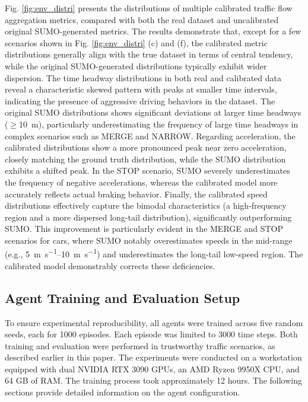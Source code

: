 Fig. \ref{fig:env_distri} presents the distributions of multiple calibrated traffic flow aggregation metrics, compared with both the real dataset and uncalibrated original SUMO-generated metrics. The results demonstrate that, except for a few scenarios shown in Fig. \ref{fig:env_distri} (c) and (f), the calibrated metric distributions generally align with the true dataset in terms of central tendency, while the original SUMO-generated distributions typically exhibit wider dispersion. The time headway distributions in both real and calibrated data reveal a characteristic skewed pattern with peaks at smaller time intervals, indicating the presence of aggressive driving behaviors in the dataset. The original SUMO distributions shows significant deviations at larger time headways ($\ge$\SI{10}{\meter}), particularly underestimating the frequency of large time headways in complex scenarios such as MERGE and NARROW.
Regarding acceleration, the calibrated distributions show a more pronounced peak near zero acceleration, closely matching the ground truth distribution, while the SUMO distribution exhibits a shifted peak.  In the STOP scenario, SUMO severely underestimates the frequency of negative accelerations, whereas the calibrated model more accurately reflects actual braking behavior. Finally, the calibrated speed distributions effectively capture the bimodal characteristics (a high-frequency region and a more dispersed long-tail distribution), significantly outperforming SUMO. This improvement is particularly evident in the MERGE and STOP scenarios for cars, where SUMO notably overestimates speeds in the mid-range (e.g., \SIrange{5}{10}{\metre\per\second}) and underestimates the long-tail low-speed region. The calibrated model demonstrably corrects these deficiencies.





\subsection{Agent Training and Evaluation Setup}
To ensure experimental reproducibility, all agents were trained across five random seeds, each for 1000 episodes. Each episode was limited to 3000 time steps. Both training and evaluation were performed in trustworthy traffic scenarios, as described earlier in this paper. 
The experiments were conducted on a workstation equipped with dual NVIDIA RTX 3090 GPUs, an AMD Ryzen 9950X CPU, and 64 GB of RAM. The training process took approximately 12 hours. The following sections provide detailed information on the agent configuration.

